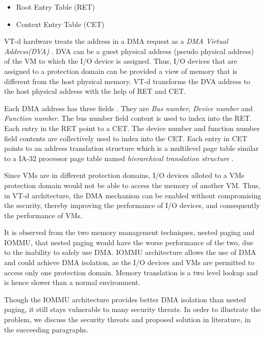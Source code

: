 \documentclass[a4paper,10pt,twocolumn]{article}
\begin{document}
  \begin{itemize}
   \item Root Entry Table (RET) 
   \item Context Entry Table (CET) 
  \end{itemize}

  VT-d hardware treats the address in a DMA request as a \emph{DMA Virtual Address(DVA)} \cite{vt-directed-io-spec} \cite{DarrenAbramson2006}. DVA can be a guest physical address (pseudo physical address) of the VM  to which the I/O device is assigned. Thus, I/O devices that are assigned to a protection domain can be provided a view of memory that is different from the host physical memory. VT-d transforms the DVA address to the host physical address with the help of RET and CET.

  Each DMA address has three fields \cite{vt-directed-io-spec} \cite{DarrenAbramson2006}. They are \emph{Bus number}, \emph{Device number} and \emph{Function number}. The bus number field content is   used to index into the RET. Each entry in the RET point to a CET. The device number and function number field contents are collectively used to index into the CET. Each entry in CET points to an address translation structure which is a multilevel page table similar to a IA-32 processor page table named \emph{hierarchical translation structure} \cite{vt-directed-io-spec}.

  Since VMs are in different protection domains, I/O devices alloted to a VMs protection domain would not be able to access the memory of another VM. Thus,  in VT-d architecture, the DMA mechanism can be enabled without compromising the security, thereby improving the performance of I/O devices, and consequently the performance of VMs.

  It is observed from the two memory management techniques, nested paging and IOMMU,  that nested paging  would have the  worse performance of the two,  due to the inability to safely use DMA. IOMMU architecture allows the use of DMA and could achieve DMA isolation, as the I/O devices and VMs are permitted to access only one protection domain. Memory translation is a two level lookup and is hence slower than a normal environment.

  Though the IOMMU architecture provides better DMA isolation than nested paging, it still stays vulnerable to many security threats. In order to illustrate the problem, we discuss the security threats and proposed solution in literature, in the succeeding paragraphs.
\end{document}
